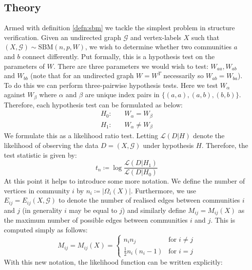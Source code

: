 \documentclass[11pt]{article}
\newcommand{\Gcal}{\mathcal{G}}
\newcommand{\lik}{\mathcal{L}}
\begin{document}
\begin{multicols*}{2}
\subsection{Theory}

Armed with definition \ref{defn:sbm} we tackle the simplest problem in structure verification. Given an undirected graph $\Gcal$ and vertex-labels $X$ such that $(X, \Gcal) \sim \textrm{SBM}(n, p, W)$, we wish to determine whether two communities $a$ and $b$ connect differently. Put formally, this is a hypothesis test on the parameters of $W$. There are three parameters we would wish to test: $W_{aa}, W_{ab}$ and $W_{bb}$ (note that for an undirected graph $W = W^T$ necessarily so $W_{ab} = W_{ba}$). To do this we can perform three-pairwise hypothesis tests. Here we test $W_{\alpha}$ against $W_{\beta}$ where $\alpha$ and $\beta$ are unique index pairs in $\{(a,a), (a, b), (b,b)\}$. Therefore, each hypothesis test can be formulated as below:
%
\begin{equation}
\begin{aligned}
	H_0:& \quad W_{\alpha} = W_{\beta} \\
	H_1:& \quad W_{\alpha} \neq W_{\beta}
\end{aligned}
\end{equation}
%
We formulate this as a likelihood ratio test. Letting $\lik(D | H)$ denote the likelihood of observing the data $D = (X, \Gcal)$ under hypothesis $H$. Therefore, the test statistic is given by:
%
\begin{equation}
	t_n \coloneqq \log \frac{\lik(D | H_1)}{\lik(D | H_0)}
	\label{eqn:test-statistic-start}
\end{equation}
%
At this point it helps to introduce some more notation. We define the number of vertices in community $i$ by $n_i \coloneqq |\Omega_i(X)|$. Furthermore, we use $E_{ij} = E_{ij}(X, \Gcal)$ to denote the number of realised edges between communities $i$ and $j$ (in generality $i$ may be equal to $j$) and similarly define $M_{ij} = M_{ij}(X)$ as the maximum number of possible edges between communities $i$ and $j$. This is computed simply as follows:
%
\begin{equation}
	M_{ij} = M_{ij} (X) = \begin{cases}
		n_i n_j &\text{for } i \neq j \\
		\frac{1}{2}n_i (n_i - 1) &\text{for } i = j
	\end{cases}
\end{equation}
%
With this new notation, the likelihood function can be written explicitly:

\end{multicols*}
\end{document}

